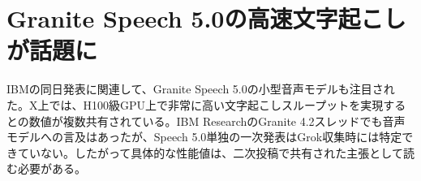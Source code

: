 \section{Granite Speech 5.0の高速文字起こしが話題に}
IBMの同日発表に関連して、Granite Speech 5.0の小型音声モデルも注目された。X上では、H100級GPU上で非常に高い文字起こしスループットを実現するとの数値が複数共有されている。IBM ResearchのGranite 4.2スレッドでも音声モデルへの言及はあったが、Speech 5.0単独の一次発表はGrok収集時には特定できていない。したがって具体的な性能値は、二次投稿で共有された主張として読む必要がある。
